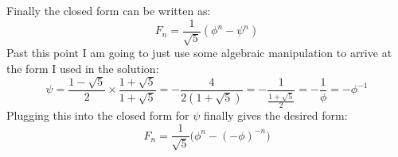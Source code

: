 \documentclass[12pt, letterpaper, onecolumn, conference, final]{IEEEtran}
\theoremstyle{definition}
\theoremstyle{plain}
\begin{document}
Finally the closed form can be written as:
\begin{equation*}
F_n = \frac{1}{\sqrt{5}} (\phi^n - \psi^n)
\end{equation*}
Past this point I am going to just use some algebraic manipulation to arrive at the form I used in the solution:
\begin{equation*}
\psi = \frac{1 - \sqrt{5}}{2} \times \frac{1 + \sqrt{5}}{1 + \sqrt{5}} = -\frac{4}{2(1 + \sqrt{5})} = -\frac{1}{\frac{1 + \sqrt{5}}{2}} = -\frac{1}{\phi} = -\phi^{-1}
\end{equation*}
Plugging this into the closed form for $\psi$ finally gives the desired form:
\begin{equation*}
F_n = \frac{1}{\sqrt{5}} \Big( \phi^n - ( -\phi)^{-n} \Big)
\end{equation*}
\end{document}
